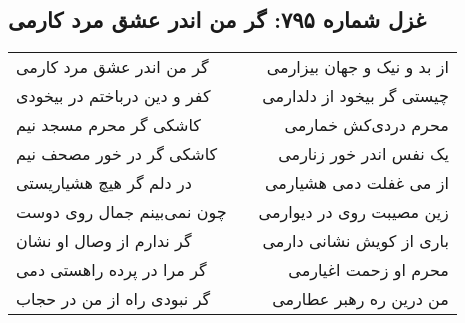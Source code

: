 \begin{center}
\section*{غزل شماره ۷۹۵: گر من اندر عشق مرد کارمی}
\label{sec:795}
\begin{longtable}{l p{0.5cm} r}
گر من اندر عشق مرد کارمی
&&
از بد و نیک و جهان بیزارمی
\\
کفر و دین درباختم در بیخودی
&&
چیستی گر بیخود از دلدارمی
\\
کاشکی گر محرم مسجد نیم
&&
محرم دردی‌کش خمارمی
\\
کاشکی گر در خور مصحف نیم
&&
یک نفس اندر خور زنارمی
\\
در دلم گر هیچ هشیاریستی
&&
از می غفلت دمی هشیارمی
\\
چون نمی‌بینم جمال روی دوست
&&
زین مصیبت روی در دیوارمی
\\
گر ندارم از وصال او نشان
&&
باری از کویش نشانی دارمی
\\
گر مرا در پرده راهستی دمی
&&
محرم او زحمت اغیارمی
\\
گر نبودی راه از من در حجاب
&&
من درین ره رهبر عطارمی
\\
\end{longtable}
\end{center}
